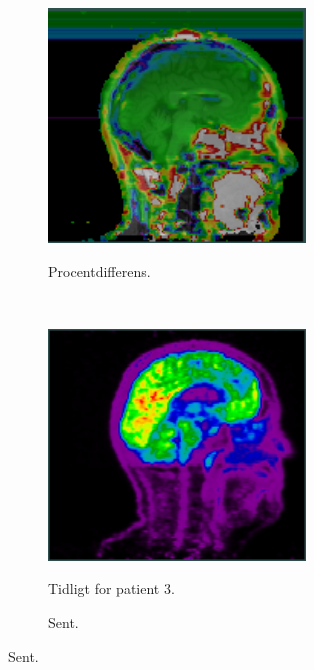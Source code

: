 \begin{figure}
\begin{subfigure}[b]{0.3\textwidth}
        \label{col:over_time_pet_pat2_late}
    \end{subfigure}\hfill
    \begin{subfigure}[b]{0.3\textwidth}
        \caption{Procentdifferens.}
        \includegraphics[width=0.75\textwidth]{colager/over_tid_pet/over_tid_140547_pd.png}
        \label{col:over_time_pet_pat2_pd}
    \end{subfigure}\\
    \begin{subfigure}[b]{0.3\textwidth}
        \caption{Tidligt for patient 3.}
        \includegraphics[width=0.75\textwidth]{colager/over_tid_pet/over_tid_210445_early.png}
        \label{col:over_time_pet_pat3_early}
    \end{subfigure}\hfill
    \begin{subfigure}[b]{0.3\textwidth}
        \caption{Sent.}

\end{subfigure}
\end{figure}
